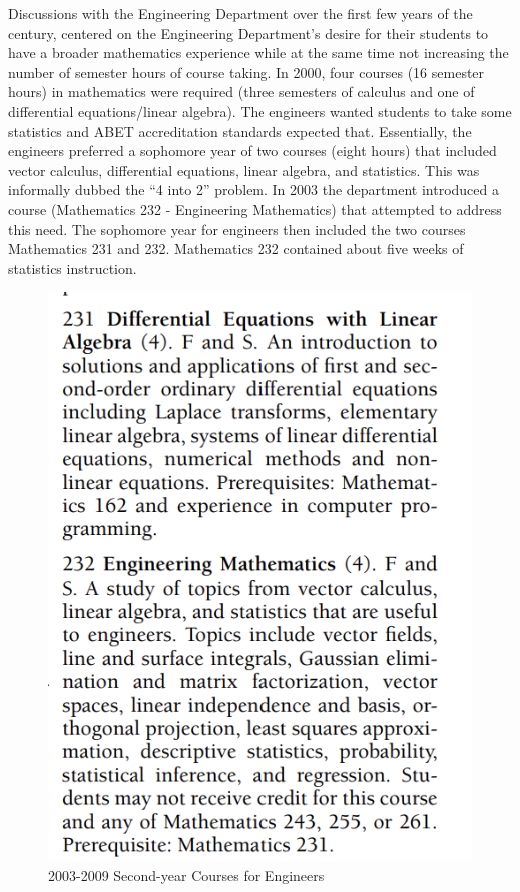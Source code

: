 \documentclass[
]{book}
\begin{document}
Discussions with the Engineering Department over the first few years of the century, centered on the Engineering Department's desire for their students to have a broader mathematics experience while at the same time not increasing the number of semester hours of course taking. In 2000, four courses (16 semester hours) in mathematics were required (three semesters of calculus and one of differential equations/linear algebra). The engineers wanted students to take some statistics and ABET accreditation standards expected that. Essentially, the engineers preferred a sophomore year of two courses (eight hours) that included vector calculus, differential equations, linear algebra, and statistics. This was informally dubbed the ``4 into 2'' problem. In 2003 the department introduced a course (Mathematics 232 - Engineering Mathematics) that attempted to address this need. The sophomore year for engineers then included the two courses Mathematics 231 and 232. Mathematics 232 contained about five weeks of statistics instruction.

\begin{figure}

{\centering \includegraphics[width=6.67in]{images/M232} 

}

\caption{2003-2009 Second-year Courses for Engineers}\label{fig:M232}
\end{figure}
\end{document}
